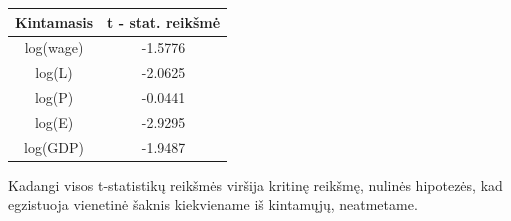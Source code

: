 \documentclass[12pt,a4paper]{article}
\theoremstyle{change}\newtheorem{salyga}{Uždavinys}
\begin{document}
\vskip 15pt

\begin{center}
\begin{tabular}{|c|c|}
\hline\textbf{ Kintamasis} &\textbf{ t - stat. reikšmė }\\ 
\hline log(wage) & -1.5776 \\ 
\hline log(L) & -2.0625 \\ 
\hline log(P) & -0.0441 \\ 
\hline log(E) & -2.9295 \\ 
\hline log(GDP) & -1.9487 \\ 
\hline 
\end{tabular} 
\end{center}
Kadangi visos t-statistikų reikšmės viršija kritinę reikšmę, nulinės hipotezės, kad egzistuoja vienetinė šaknis kiekviename iš kintamųjų, neatmetame. 










     
     
\end{document}

